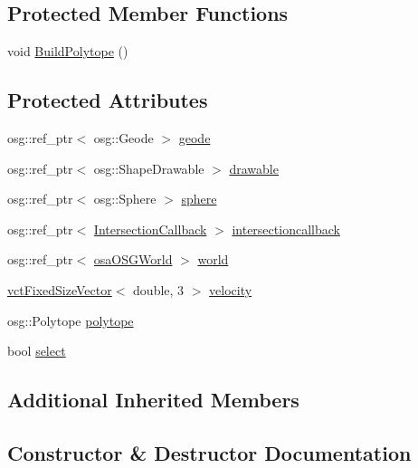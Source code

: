 \subsection*{Protected Member Functions}
\begin{DoxyCompactItemize}
\item 
void \hyperlink{classosa_o_s_g_pointer3_d_a86a35fd43800ca80364a27ea13780013}{Build\+Polytope} ()
\end{DoxyCompactItemize}
\subsection*{Protected Attributes}
\begin{DoxyCompactItemize}
\item 
osg\+::ref\+\_\+ptr$<$ osg\+::\+Geode $>$ \hyperlink{classosa_o_s_g_pointer3_d_af706c282ea0f7b14ae0b430a3b769510}{geode}
\item 
osg\+::ref\+\_\+ptr$<$ osg\+::\+Shape\+Drawable $>$ \hyperlink{classosa_o_s_g_pointer3_d_ab6c2c828a3e43d02bb12dac34b12cbbc}{drawable}
\item 
osg\+::ref\+\_\+ptr$<$ osg\+::\+Sphere $>$ \hyperlink{classosa_o_s_g_pointer3_d_a3f2f4ea0fac395d6b6a8cb20af610d9d}{sphere}
\item 
osg\+::ref\+\_\+ptr$<$ \hyperlink{classosa_o_s_g_pointer3_d_1_1_intersection_callback}{Intersection\+Callback} $>$ \hyperlink{classosa_o_s_g_pointer3_d_add1c2a935b2af684bf2cc3c180410a1c}{intersectioncallback}
\item 
osg\+::ref\+\_\+ptr$<$ \hyperlink{classosa_o_s_g_world}{osa\+O\+S\+G\+World} $>$ \hyperlink{classosa_o_s_g_pointer3_d_a6576d36096a1c3a9127fbf9dbafee677}{world}
\item 
\hyperlink{classvct_fixed_size_vector}{vct\+Fixed\+Size\+Vector}$<$ double, 3 $>$ \hyperlink{classosa_o_s_g_pointer3_d_a9ed8936280696f8f7bd78bb1d20e7d81}{velocity}
\item 
osg\+::\+Polytope \hyperlink{classosa_o_s_g_pointer3_d_a99d8f639a80c650298763ab6f28c711a}{polytope}
\item 
bool \hyperlink{classosa_o_s_g_pointer3_d_acd02af84dcccbf5bb89fda754600414d}{select}
\end{DoxyCompactItemize}
\subsection*{Additional Inherited Members}


\subsection{Constructor \& Destructor Documentation}
\hypertarget{classosa_o_s_g_pointer3_d_ab3ac4146d29dbee143442e45d5291ebb}{}
